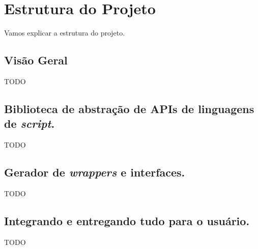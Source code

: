\chapter{Estrutura do Projeto}
\label{sec:estrutura}
Vamos explicar a estrutura do projeto.

\section{Visão Geral}
\label{sec:estrutura:geral}

TODO

\section{Biblioteca de abstração de APIs de linguagens de \emph{script}.}
\label{sec:estrutura:opa}
TODO

\section{Gerador de \emph{wrappers} e interfaces.}
\label{sec:estrutura:opwig}
TODO

\section{Integrando e entregando tudo para o usuário.}
\label{sec:estrutura:integration}
TODO
